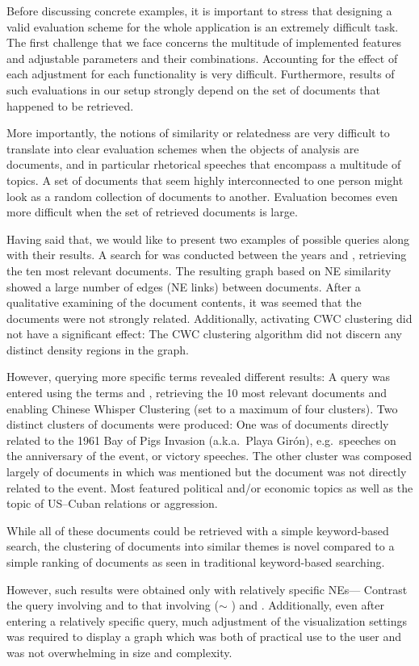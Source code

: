 Before discussing concrete examples, it is important to stress that designing a valid evaluation
scheme for the whole application is an extremely difficult task. The first challenge that we face
concerns the multitude of implemented features and adjustable parameters and their combinations.
Accounting for the effect of each adjustment for each functionality is very difficult. Furthermore,
results of such evaluations in our setup strongly depend on the set of documents that happened to be
retrieved.   

More importantly, the notions of similarity or relatedness are very difficult to translate into clear evaluation schemes when the objects of analysis are documents, and in particular rhetorical speeches that encompass a multitude of topics. A set of documents that seem highly interconnected to one person might look as a random collection of documents to another. Evaluation becomes even more difficult when the set of retrieved documents is large. 

Having said that, we would like to present two examples of possible queries along with their results.
A search for  was conducted between the years  and , retrieving the ten most relevant documents. The resulting graph based on NE similarity showed a large number of 
edges (NE links) between documents. After a qualitative examining of the document contents, it was seemed that the documents were not strongly related. Additionally, activating CWC clustering did not have a significant effect: The CWC clustering algorithm did not discern any distinct density regions in the graph.

However, querying more specific terms revealed different results: A query was entered using the terms  and , retrieving the 10 most relevant documents and enabling Chinese Whisper Clustering (set to a maximum of four clusters). Two distinct clusters of documents were produced: One was of documents directly related to the 1961 Bay of Pigs Invasion (a.k.a.\ Playa Gir\'{o}n), e.g.\ speeches on the anniversary of the event, or victory speeches. The other cluster was composed largely of documents in which  was mentioned but the document was not directly related to the event. Most featured political and/or economic topics as well as the topic of US--Cuban relations or aggression.

While all of these documents could be retrieved with a simple keyword-based search, the clustering of documents into similar themes is novel compared to a simple ranking of documents as seen in traditional keyword-based searching.

However, such results were obtained only with relatively specific NEs--- Contrast the query involving  and  to that involving  ($\sim$ )  and . Additionally, even after entering a relatively specific query, much adjustment of the visualization settings was required to display a graph which was both of practical use to the user and was not overwhelming in size and complexity.
